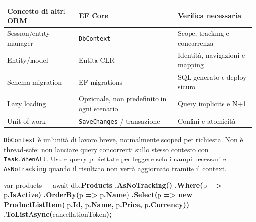 \documentclass[
  italian,
  10pt,
]{book}
\newenvironment{Shaded}{\begin{snugshade}}{\end{snugshade}}
\newcommand{\DataTypeTok}[1]{\textcolor[rgb]{0.13,0.29,0.53}{#1}}
\newcommand{\FunctionTok}[1]{\textcolor[rgb]{0.13,0.29,0.53}{\textbf{#1}}}
\newcommand{\KeywordTok}[1]{\textcolor[rgb]{0.13,0.29,0.53}{\textbf{#1}}}
\newcommand{\NormalTok}[1]{#1}
\newcommand{\OperatorTok}[1]{\textcolor[rgb]{0.81,0.36,0.00}{\textbf{#1}}}
\newcounter{none} %
\begin{document}
{\def\LTcaptype{none} %
\begin{longtable}[]{@{}
  >{\raggedright\arraybackslash}p{}
  >{\raggedright\arraybackslash}p{}
  >{\raggedright\arraybackslash}p{}@{}}
\toprule\noalign{}
\begin{minipage}[b]{\linewidth}\raggedright
Concetto di altri ORM
\end{minipage} & \begin{minipage}[b]{\linewidth}\raggedright
EF Core
\end{minipage} & \begin{minipage}[b]{\linewidth}\raggedright
Verifica necessaria
\end{minipage} \\
\midrule\noalign{}
\endhead
\bottomrule\noalign{}
\endlastfoot
Session/entity manager & \texttt{DbContext} & Scope, tracking e
concorrenza \\
Entity/model & Entità CLR & Identità, navigazioni e mapping \\
Schema migration & EF migrations & SQL generato e deploy sicuro \\
Lazy loading & Opzionale, non predefinito in ogni scenario & Query
implicite e N+1 \\
Unit of work & \texttt{SaveChanges} / transazione & Confini e
atomicità \\
\end{longtable}
}

\texttt{DbContext} è un'unità di lavoro breve, normalmente scoped per
richiesta. Non è thread-safe: non lanciare query concorrenti sullo
stesso contesto con \texttt{Task.WhenAll}. Usare query proiettate per
leggere solo i campi necessari e \texttt{AsNoTracking} quando il
risultato non verrà aggiornato tramite il context.

\begin{Shaded}
\begin{Highlighting}[]
\DataTypeTok{var}\NormalTok{ products }\OperatorTok{=}\NormalTok{ await db}\OperatorTok{.}\FunctionTok{Products}
    \OperatorTok{.}\FunctionTok{AsNoTracking}\OperatorTok{()}
    \OperatorTok{.}\FunctionTok{Where}\OperatorTok{(}\NormalTok{p }\OperatorTok{=\textgreater{}}\NormalTok{ p}\OperatorTok{.}\FunctionTok{IsActive}\OperatorTok{)}
    \OperatorTok{.}\FunctionTok{OrderBy}\OperatorTok{(}\NormalTok{p }\OperatorTok{=\textgreater{}}\NormalTok{ p}\OperatorTok{.}\FunctionTok{Name}\OperatorTok{)}
    \OperatorTok{.}\FunctionTok{Select}\OperatorTok{(}\NormalTok{p }\OperatorTok{=\textgreater{}} \KeywordTok{new} \FunctionTok{ProductListItem}\OperatorTok{(}
\NormalTok{        p}\OperatorTok{.}\FunctionTok{Id}\OperatorTok{,}\NormalTok{ p}\OperatorTok{.}\FunctionTok{Name}\OperatorTok{,}\NormalTok{ p}\OperatorTok{.}\FunctionTok{Price}\OperatorTok{,}\NormalTok{ p}\OperatorTok{.}\FunctionTok{Currency}\OperatorTok{))}
    \OperatorTok{.}\FunctionTok{ToListAsync}\OperatorTok{(}\NormalTok{cancellationToken}\OperatorTok{);}
\end{Highlighting}
\end{Shaded}
\end{document}
